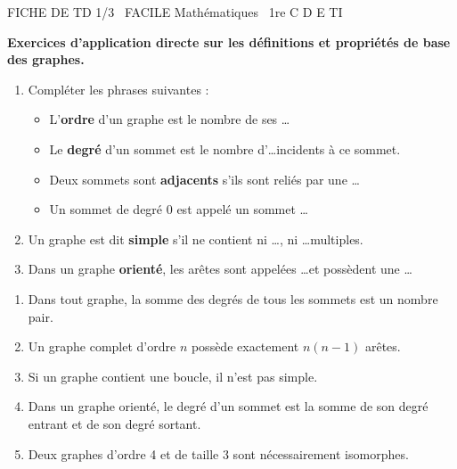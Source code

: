 \documentclass[11pt]{article}
\begin{document}
\begin{tcolorbox}[enhanced,colback=popink,colframe=popink,arc=10pt,boxrule=0pt,left=12pt,right=12pt,top=9pt,bottom=9pt]
{\color{white}\popxbold\small FICHE DE TD 1/3 \textbullet\ FACILE \hfill Mathématiques \textbullet\ 1re C D E TI\par}
\end{tcolorbox}
\vspace{4pt}
\textbf{Exercices d'application directe sur les définitions et propriétés de base des graphes.}

\begin{exercice}
\begin{enumerate}
    \item Compléter les phrases suivantes :
    \begin{itemize}
        \item L'\textbf{ordre} d'un graphe est le nombre de ses \ldots
        \item Le \textbf{degré} d'un sommet est le nombre d'\ldots incidents à ce sommet.
        \item Deux sommets sont \textbf{adjacents} s'ils sont reliés par une \ldots
        \item Un sommet de degré 0 est appelé un sommet \ldots
    \end{itemize}
    \item Un graphe est dit \textbf{simple} s'il ne contient ni \ldots, ni \ldots multiples.
    \item Dans un graphe \textbf{orienté}, les arêtes sont appelées \ldots et possèdent une \ldots
\end{enumerate}
\end{exercice}

\begin{exercice}
\begin{enumerate}
    \item Dans tout graphe, la somme des degrés de tous les sommets est un nombre pair.
    \item Un graphe complet d'ordre $n$ possède exactement $n(n-1)$ arêtes.
    \item Si un graphe contient une boucle, il n'est pas simple.
    \item Dans un graphe orienté, le degré d'un sommet est la somme de son degré entrant et de son degré sortant.
    \item Deux graphes d'ordre 4 et de taille 3 sont nécessairement isomorphes.
\end{enumerate}
\end{exercice}
\end{document}
